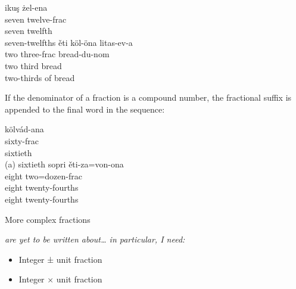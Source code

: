 \documentclass[grammar]{subfiles}
\begin{document}
  \begin{exe}
    \ex
    \begin{xlist}
      \ex {}
      \glll ikuş żel-ena\\
      seven twelve-\acs{frac}\\
      seven twelfth\\
      \glt seven-twelfths
      \ex {}
      \glll ěti köl-öna litas-ev-a\\
      two three-\acs{frac} bread-\acs{du}-\acs{nom}\\
      two third bread\\
      \glt two-thirds of bread
    \end{xlist}
  \end{exe}

  If the denominator of a fraction is a compound number, the fractional suffix is appended to the final word in the sequence:

  \begin{exe}
    \ex
    \begin{xlist}
      \ex {}
      \glll kölvád-ana\\
      sixty-\acs{frac}\\
      sixtieth\\
      \glt (a) sixtieth
      \ex {}
      \glll sopri ěti-za=von-ona\\
      eight two=dozen-\acs{frac}\\
      eight twenty-fourths\\
      \glt eight twenty-fourths
    \end{xlist}
  \end{exe}


  More complex fractions {\em are yet to be written about… in particular, I need:
    \begin{itemize}
      \item Integer ± unit fraction
      \item Integer × unit fraction
    \end{itemize}
  }
\end{document}
